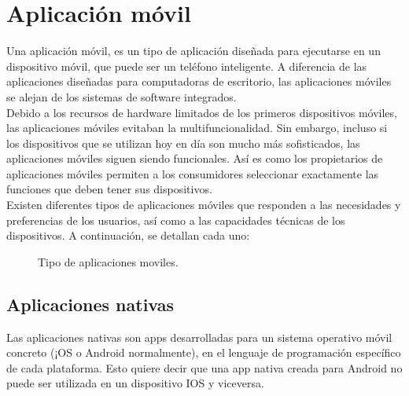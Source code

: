 
\section{Aplicación móvil}
Una aplicación móvil, es un tipo de aplicación diseñada para ejecutarse en un dispositivo móvil, que puede ser un teléfono inteligente. A  diferencia de las aplicaciones diseñadas para computadoras de escritorio, las aplicaciones móviles se alejan de los sistemas de software integrados. \\

Debido a los recursos de hardware limitados de los primeros dispositivos móviles, las aplicaciones móviles evitaban la multifuncionalidad. Sin embargo, incluso si los dispositivos que se utilizan hoy en día son mucho más sofisticados, las aplicaciones móviles siguen siendo funcionales. Así es como los propietarios de aplicaciones móviles permiten a los consumidores seleccionar exactamente las funciones que deben tener sus dispositivos. \\

Existen diferentes tipos de aplicaciones móviles que responden a las necesidades y preferencias de los usuarios, así como a las capacidades técnicas de los dispositivos. A continuación, se detallan cada uno:

\begin{figure}[htbp]
	\begin{center}
		\caption{Tipo de aplicaciones moviles.}
		\label{fig:casosDeUso}
	\end{center}
\end{figure}

\subsection{Aplicaciones nativas}
Las aplicaciones nativas son apps desarrolladas para un sistema operativo móvil concreto (¡OS o Android normalmente), en el lenguaje de programación específico de cada plataforma. Esto quiere decir que una app nativa creada para Android no puede ser utilizada en un dispositivo IOS y viceversa. \\


